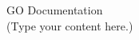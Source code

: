 \documentclass{article}
\begin{document}
GO Documentation\\
(Type your content here.)
\end{document}
